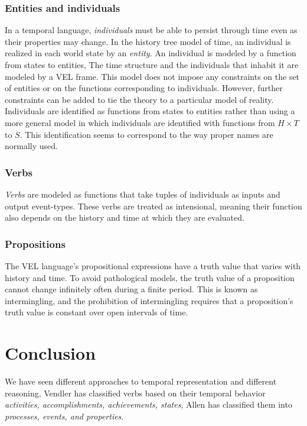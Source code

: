 \subsubsection{Entities and individuals}
In a temporal language, \textit{individuals} must be able to persist through time even as their properties may change.
In the history tree model of time, an individual is realized in each world state by an \textit{entity}.
An individual is modeled by a function from states to entities, The time structure and the individuals that inhabit it are modeled by a VEL frame. This model does not impose any constraints on the set of entities or on the functions corresponding to individuals.
However, further constraints can be added to tie the theory to a particular model of reality.
Individuals are identified as functions from states to entities rather than using a more general model in which individuals are identified with functions from $H \times T$ to $S$. This identification seems to correspond to the way proper names are normally used.

\subsubsection{Verbs}
\textit{Verbs} are modeled as functions that take tuples of individuals as inputs and output event-types.
These verbs are treated as intensional, meaning their function also depends on the history and time at which they are evaluated.
\subsubsection{Propositions}
The VEL language's propositional expressions have a truth value that varies with history and time. To avoid pathological models, the truth value of a proposition cannot change infinitely often during a finite period. This is known as intermingling, and the prohibition of intermingling requires that a proposition's truth value is constant over open intervals of time.


\section{Conclusion}
We have seen different approaches to temporal representation and different reasoning,
Vendler has classified verbs based on their temporal behavior \textit{activities, accomplishments, achievements, states},
Allen has classified them into \textit{processes, events, and properties}.

